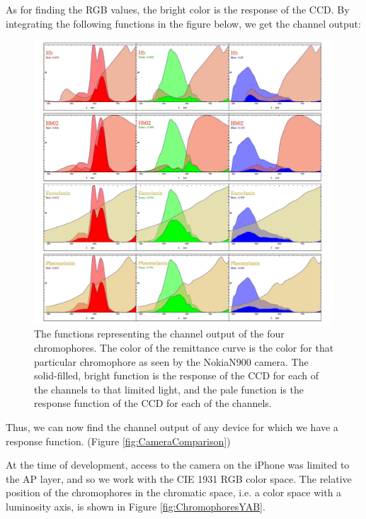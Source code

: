 As for finding the RGB values, the bright color is the response of the CCD. By integrating the following functions in the figure below, we get the channel output:


\begin{figure}[h!]
  \centering
    \includegraphics[width=0.99\textwidth]{Chapter1/Figs/Chromophores_NokiaN900.jpg}
    \caption{The functions representing the channel output of the four chromophores. The color of the remittance curve is the color for that particular chromophore as seen by the NokiaN900 camera. The solid-filled, bright function is the response of the CCD for each of the channels to that limited light, and the pale function is the response function of the CCD for each of the channels.}  \label{fig:Chromophores_NokiaN900}
\end{figure}



Thus, we can now find the channel output of any device for which we have a response function. (Figure \ref{fig:CameraComparison})

At the time of development, access to the camera on the iPhone was limited to the AP layer, and so we work with the CIE 1931 RGB color space. The relative position of the chromophores in the chromatic space, i.e. a color space with a luminosity axis, is shown in Figure \ref{fig:ChromophoresYAB}.



